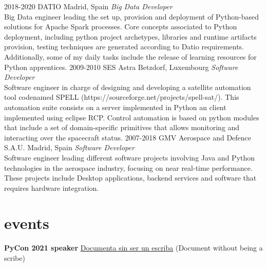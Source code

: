 \documentclass[]{friggeri-cv}
\begin{document}
\begin{entrylist}
\entry
{2018-2020}
{DATIO}
{Madrid, Spain}
{\emph{Big Data Developer} \\
Big Data engineer leading the set up, provision and deployment of Python-based solutions for Apache Spark processes.
Core concepts associated to Python deployment, including python project archetypes, libraries and runtime artifacts provision, testing techniques are
generated according to Datio requirements. Additionally, some of my daily tasks include the release of learning resources for Python apprentices.}
\entry
{2009-2010}
{SES Astra}
{Betzdorf, Luxembourg}
{\emph{Software Developer} \\
Software engineer in charge of designing and developing a satellite automation tool codenamed SPELL (https://sourceforge.net/projects/spell-sat/).
This automation suite consists on a server implemented in Python an client implemented using eclipse RCP.
Control automation is based on python modules that include a set of domain-specific primitives that allows monitoring and interacting over the
spacecraft status.}
\entry
{2007-2018}
{GMV Aerospace and Defence S.A.U.}
{Madrid, Spain}
{\emph{Software Developer} \\
Software engineer leading different software projects involving Java and Python technologies in the aerospace industry, focusing on near real-time performance.
These projects include Desktop applications, backend services and software that requires hardware integration.}
\end{entrylist}


\section{events}

\textbf{\headingfont PyCon 2021 speaker} \href{https://www.youtube.com/watch?v=U8SP_Osd8ZY}{Documenta sin ser un escriba} (Document without being a scribe)
 
\end{document}
